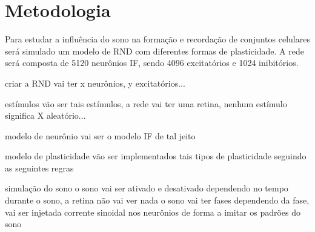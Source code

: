 \chapter{Metodologia}

Para estudar a influência do sono na formação e recordação de conjuntos celulares será simulado
um modelo de RND com diferentes formas de plasticidade. A rede será composta de 
5120 neurônios IF, sendo 4096 excitatórios e 1024 inibitórios.


criar a RND
vai ter x neurônios, y excitatórios...

estímulos
vão ser tais estímulos, a rede vai ter uma retina, nenhum estímulo significa X aleatório...

modelo de neurônio
vai ser o modelo IF de tal jeito

modelo de plasticidade
vão ser implementados tais tipos de plasticidade seguindo as seguintes regras

simulação do sono
o sono vai ser ativado e desativado dependendo no tempo
durante o sono, a retina não vai ver nada
o sono vai ter fases
dependendo da fase, vai ser injetada corrente sinoidal nos neurônios de forma a imitar os padrões do sono




